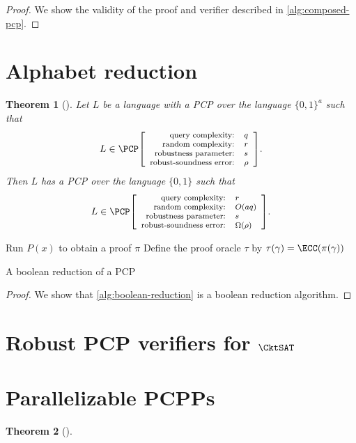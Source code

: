 \documentclass[english,12pt]{reedthesis}
\theoremstyle{plain}
\newtheorem{thm}{Theorem}[section]
\theoremstyle{definition}
\theoremstyle{remark}
\newcommand{\pcpr}[4]{%
  \ensuremath%
  \mleft[{\footnotesize\begin{array}{r l}
    \text{query complexity:} & #1 \\
    \text{random complexity:} & #2 \\
    \text{robustness parameter:} & #3 \\
    \text{robust-soundness error:} & #4
  \end{array}}\mright]%
}
\begin{document}
\begin{proof}
  We show the validity of the proof and verifier described in
  \cref{alg:composed-pcp}.
\end{proof}


\section{Alphabet reduction}\label{sec:alph-reduction}

\begin{thm}[{\cite[Lemma 2.13]{BGHSV06}}]%
  \label{thm:alph-reduction}
  Let $L$ be a language with a PCP over the language $\{0, 1\}^{a}$ such
  that
  \[
    L \in \PCP\pcpr{q}{r}{s}{\rho}.
  \]
  Then $L$ has a PCP over the language $\{0, 1\}$ such that
  \[
    L \in \PCP\pcpr{r}{O(aq)}{s}{\Omega(\rho)}.
  \]
\end{thm}

\begin{algorithm}[htbp]
  Run $P(x)$ to obtain a proof $\pi$\;
  Define the proof oracle $\tau$ by $\tau(\gamma) = \ECC(\pi(\gamma))$\;
  \KwRet{$(\pi, \tau)$}\;
  \caption{A boolean reduction of a PCP~\cite[Construction 3.6]{GOS25}}\label{alg:boolean-reduction}
\end{algorithm}

\begin{proof}
  We show that \cref{alg:boolean-reduction} is a boolean reduction algorithm.
\end{proof}

\section{Robust PCP verifiers for $\CktSAT$}\label{sec:robust-pcp-cktsat}


\section{Parallelizable PCPPs}\label{sec:parallel-pcp}


\begin{thm}[{\cite[Theorem 2.1.9]{ALMSS98}}]\label{thm:always-robust-pcpp}
\end{thm}
\end{document}
